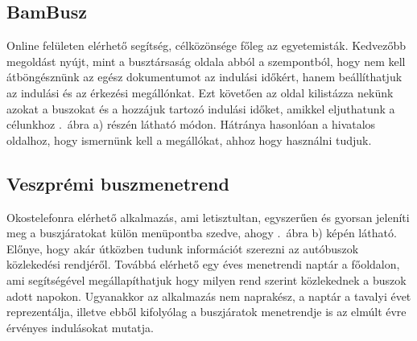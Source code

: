 \subsection{BamBusz}
\label{bambusz}

Online felületen elérhető segítség\cite{bambusz}, célközönsége főleg az egyetemisták. 
Kedvezőbb megoldást nyújt, mint a busztársaság oldala abból a szempontból, hogy nem kell átböngésznünk az egész dokumentumot az indulási időkért, hanem beállíthatjuk az indulási és az érkezési megállónkat. 
Ezt követően az oldal kilistázza nekünk azokat a buszokat és a hozzájuk tartozó indulási időket, amikkel eljuthatunk a célunkhoz .\ ábra a) részén látható módon. 
Hátránya hasonlóan a hivatalos oldalhoz, hogy ismernünk kell a megállókat, ahhoz hogy használni tudjuk. 


\subsection{Veszprémi buszmenetrend}
\label{veszprbuszmen}

Okostelefonra elérhető alkalmazás\cite{veszprembusz}, ami letisztultan, egyszerűen és gyorsan jeleníti meg a buszjáratokat külön menüpontba szedve, ahogy .\ ábra b) képén látható. 
Előnye, hogy akár útközben tudunk információt szerezni az autóbuszok közlekedési rendjéről. 
Továbbá elérhető egy éves menetrendi naptár a főoldalon, ami segítségével megállapíthatjuk hogy milyen rend szerint közlekednek a buszok adott napokon. 
Ugyanakkor az alkalmazás nem naprakész, a naptár a tavalyi évet reprezentálja, illetve ebből kifolyólag a buszjáratok menetrendje is az elmúlt évre érvényes indulásokat mutatja.

\newpage
